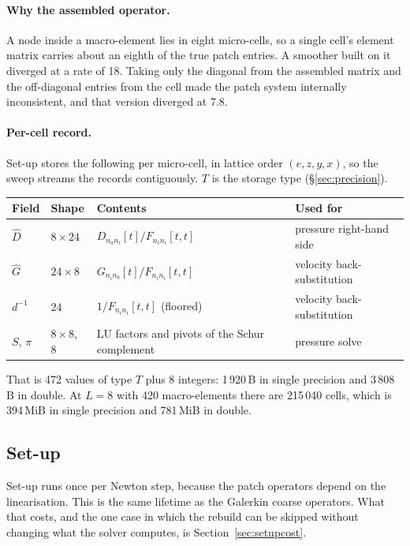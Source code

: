 \documentclass[11pt,a4paper]{article}
\begin{document}
\paragraph{Why the assembled operator.} A node inside a macro-element lies in eight
micro-cells, so a single cell's element matrix carries about an eighth of the true patch
entries. A smoother built on it diverged at a rate of 18. Taking only the diagonal from the
assembled matrix and the off-diagonal entries from the cell made the patch system internally
inconsistent, and that version diverged at 7.8.

\paragraph{Per-cell record.} Set-up stores the following per micro-cell, in lattice order
$(e, z, y, x)$, so the sweep streams the records contiguously. $T$ is the storage type
(\S\ref{sec:precision}).
\begin{center}
\begin{tabular}{@{}llll@{}}
\toprule
Field & Shape & Contents & Used for \\
\midrule
$\hat D$ & $8\times24$ & $D_{n_a n_i}[t] / F_{n_i n_i}[t,t]$ & pressure right-hand side \\
$\hat G$ & $24\times8$ & $G_{n_i n_b}[t] / F_{n_i n_i}[t,t]$ & velocity back-substitution \\
$d^{-1}$ & $24$ & $1 / F_{n_i n_i}[t,t]$ (floored) & velocity back-substitution \\
$S$, $\pi$ & $8\times8$, $8$ & LU factors and pivots of the Schur complement & pressure solve \\
\bottomrule
\end{tabular}
\end{center}
That is 472 values of type $T$ plus 8 integers: 1\,920\,B in single precision and
3\,808\,B in double. At $L=8$ with 420 macro-elements there are 215\,040 cells, which is
394\,MiB in single precision and 781\,MiB in double.

\subsection{Set-up}

Set-up runs once per Newton step, because the patch operators depend on the linearisation.
This is the same lifetime as the Galerkin coarse operators. What that costs, and the one case
in which the rebuild can be skipped without changing what the solver computes, is
Section~\ref{sec:setupcost}.
\end{document}
